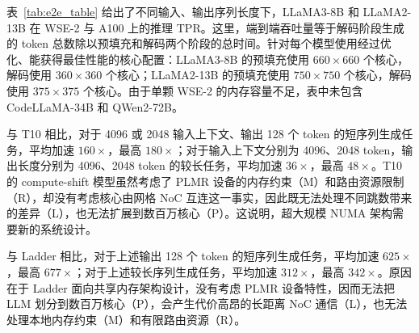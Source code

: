  表~\ref{tab:e2e_table} 给出了不同输入、输出序列长度下，LLaMA3-8B 和 LLaMA2-13B 在 WSE-2 与 A100 上的推理 TPR。这里，端到端吞吐量等于解码阶段生成的 token 总数除以预填充和解码两个阶段的总时间。\sys 针对每个模型使用经过优化、能获得最佳性能的核心配置：LLaMA3-8B 的预填充使用 $660\times660$ 个核心，解码使用 $360\times360$ 个核心；LLaMA2-13B 的预填充使用 $750\times750$ 个核心，解码使用 $375\times375$ 个核心。由于单颗 WSE-2 的内存容量不足，表中未包含 CodeLLaMA-34B 和 QWen2-72B。

与 T10 相比，对于 4096 或 2048 输入上下文、输出 128 个 token 的短序列生成任务，\sys 平均加速 $160\times$，最高 $180\times$；对于输入上下文分别为 4096、2048 token，输出长度分别为 4096、2048 token 的较长任务，平均加速 $36\times$，最高 $48\times$。T10 的 compute-shift 模型虽然考虑了 PLMR 设备的内存约束（M）和路由资源限制（R），却没有考虑核心由网格 NoC 互连这一事实，因此既无法处理不同跳数带来的差异（L），也无法扩展到数百万核心（P）。这说明，超大规模 NUMA 架构需要新的系统设计。

与 Ladder 相比，对于上述输出 128 个 token 的短序列生成任务，\sys 平均加速 $625\times$，最高 $677\times$；对于上述较长序列生成任务，平均加速 $312\times$，最高 $342\times$。原因在于 Ladder 面向共享内存架构设计，没有考虑 PLMR 设备特性，因而无法把 LLM 划分到数百万核心（P），会产生代价高昂的长距离 NoC 通信（L），也无法处理本地内存约束（M）和有限路由资源（R）。

